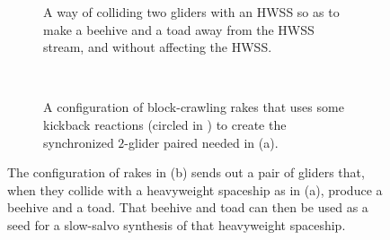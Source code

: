 \begin{figure}[!htb]
	\centering
	\begin{subfigure}[b]{0.28\textwidth}
		\centering
		\caption{A way of colliding two gliders with an HWSS so as to make a beehive and a toad away from the HWSS stream, and without affecting the HWSS.}\label{fig:hwss_toad_beehive}
	\end{subfigure} \ \	\ \ \begin{subfigure}[b]{0.69\textwidth}
		\centering
		\caption{A configuration of block-crawling rakes that uses some kickback reactions (circled in ) to create the synchronized $2$-glider paired needed in (a).}\label{fig:31c_240_double_gun}
	\end{subfigure}
	\caption{The configuration of rakes in (b) sends out a pair of gliders that, when they collide with a heavyweight spaceship as in (a), produce a beehive and a toad. That beehive and toad can then be used as a seed for a slow-salvo synthesis of that heavyweight spaceship.}\label{fig:31c_240_double_gun_at_hwss}
\end{figure}

